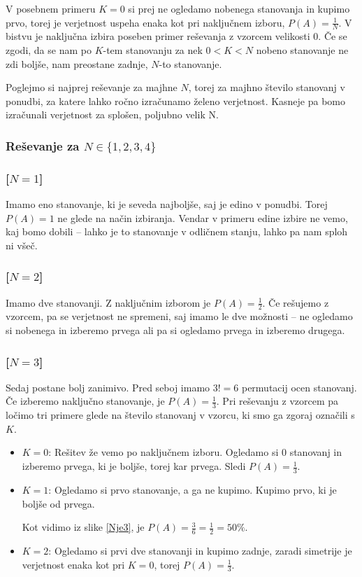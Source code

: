 \documentclass[a4paper, 12pt, titlepage]{article}
\begin{document}
V posebnem primeru $K=0$ si prej ne ogledamo nobenega stanovanja in kupimo prvo, torej je verjetnost uspeha enaka kot pri naključnem izboru, $P(A)=\frac{1}{N}$. V bistvu je naključna izbira poseben primer reševanja z vzorcem velikosti $0$. Če se zgodi, da se nam po $K$-tem stanovanju za nek $0 < K < N$ nobeno stanovanje ne zdi boljše, nam preostane zadnje, $N$-to stanovanje.

Poglejmo si najprej reševanje za majhne $N$, torej za majhno število stanovanj v ponudbi, za katere lahko ročno izračunamo želeno verjetnost. Kasneje pa bomo izračunali verjetnost za splošen, poljubno velik N.

\subsubsection{Reševanje za $N \in \{1,2,3,4\}$}

\subsubsection*{[$N=1$]}
Imamo eno stanovanje, ki je seveda najboljše, saj je edino v ponudbi. Torej $P(A)=1$ ne glede na način izbiranja. Vendar v primeru edine izbire ne vemo, kaj bomo dobili -- lahko je to stanovanje v odličnem stanju, lahko pa nam sploh ni všeč.

\subsubsection*{[$N=2$]}
Imamo dve stanovanji. Z naključnim izborom je $P(A)=\frac{1}{2}$. Če rešujemo z vzorcem, pa se verjetnost ne spremeni, saj imamo le dve možnosti -- ne ogledamo si nobenega in izberemo prvega ali pa si ogledamo prvega in izberemo drugega.

\subsubsection*{[$N=3$]}
Sedaj postane bolj zanimivo. Pred seboj imamo $3!=6$ permutacij ocen stanovanj. Če izberemo naključno stanovanje, je $P(A)=\frac{1}{3}$. Pri reševanju z vzorcem pa ločimo tri primere glede na število stanovanj v vzorcu, ki smo ga zgoraj označili s $K$.
\begin{itemize}
    \item $K=0$: Rešitev že vemo po naključnem izboru. Ogledamo si 0 stanovanj in izberemo prvega, ki je boljše, torej kar prvega. Sledi $P(A)=\frac{1}{3}$.
    \item $K=1$: Ogledamo si prvo stanovanje, a ga ne kupimo. Kupimo prvo, ki je boljše od prvega.

    Kot vidimo iz slike \ref{Nje3}, je $P(A)=\frac{3}{6}=\frac{1}{2}=50\%$.

    \item $K=2$: Ogledamo si prvi dve stanovanji in kupimo zadnje, zaradi simetrije je verjetnost enaka kot pri $K=0$, torej $P(A)=\frac{1}{3}$.
\end{itemize}
\end{document}
